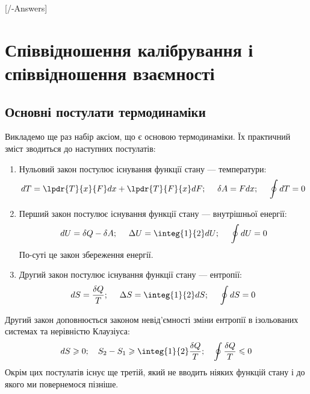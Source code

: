 
\setcounter{chapter}{3}

[\currfilebase/\currfilebase-Answers]
\chapter{Співвідношення калібрування і співвідношення взаємності}\label{\currfilebase}
\graphicspath{{\currfilebase/pictures}}
\makeatletter
{}
\makeatother

\section{Основні постулати термодинаміки}
Викладемо ще раз набір аксіом, що є основою термодинаміки. Їх практичний зміст зводиться до наступних постулатів:
\begin{enumerate}
	\item [а)] Нульовий закон постулює існування функції стану --- температури:
	      \begin{equation}\label{4.1}
		      dT = \lpdr{T}{x}{F}dx + \lpdr{T}{F}{x}dF; ~~~~ \delta A = Fdx; ~~~~ \oint dT = 0
	      \end{equation}
	\item [б)] Перший закон постулює існування функції стану --- внутрішньої енергії:
	      \begin{equation}\label{4.2}
		      dU = \delta Q - \delta A; ~~~~ \Delta U = \integ{1}{2}dU; ~~~~ \oint dU=0
	      \end{equation}
	      По-суті це закон збереження енергії.
	\item [в)] Другий закон постулює існування функції стану --- ентропії:
	      \begin{equation}\label{4.3}
		      dS = \dfrac{\delta Q}{T}; ~~~~ \Delta S = \integ{1}{2}dS; ~~~~ \oint dS = 0
	      \end{equation}
\end{enumerate}
Другий закон доповнюється законом невід'ємності зміни ентропії в ізольованих системах та нерівністю Клаузіуса:
\begin{equation}\label{4.4}
	dS \geqslant 0; \quad S_2-S_1 \geqslant \integ{1}{2}\frac{\delta Q}{T}; \quad \oint \frac{\delta
		Q}{T}
	\leqslant 0
\end{equation}
Окрім цих постулатів існує ще третій, який не вводить ніяких функцій стану і до якого ми повернемося
пізніше.

